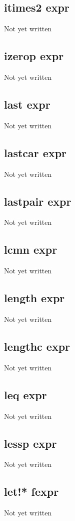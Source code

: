 \documentclass[a4paper,11pt]{article}
\begin{document}
\subsection{\ttfamily itimes2 expr}
Not yet written

\subsection{\ttfamily izerop expr}
Not yet written

\subsection{\ttfamily last expr}
Not yet written

\subsection{\ttfamily lastcar expr}
Not yet written

\subsection{\ttfamily lastpair expr}
Not yet written

\subsection{\ttfamily lcmn expr}
Not yet written

\subsection{\ttfamily length expr}
Not yet written

\subsection{\ttfamily lengthc expr}
Not yet written

\subsection{\ttfamily leq expr}
Not yet written

\subsection{\ttfamily lessp expr}
Not yet written

\subsection{\ttfamily let!* fexpr}
Not yet written
\end{document}
